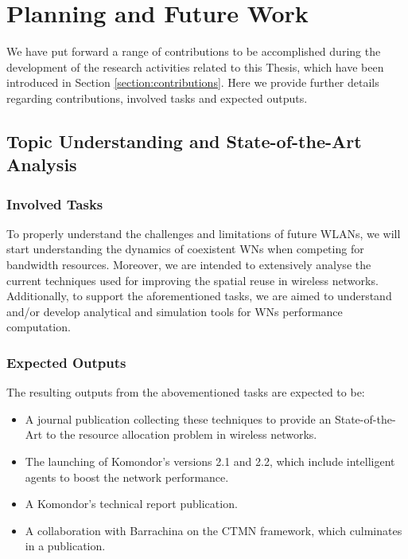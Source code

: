 \documentclass[12pt, a4paper,twoside]{tesi_upf}
\begin{document}
	\chapter{Planning and Future Work}
	\label{section:future_work}		
		We have put forward a range of contributions to be accomplished during the development of the research activities related to this Thesis, which have been introduced in Section \ref{section:contributions}. Here we provide further details regarding contributions, involved tasks and expected outputs.

		\section{Topic Understanding and State-of-the-Art Analysis}
		\label{section:contribution1}				
			\subsection{Involved Tasks}				
				To properly understand the challenges and limitations of future WLANs, we will start understanding the dynamics of coexistent WNs when competing for bandwidth resources. Moreover, we are intended to extensively analyse the current techniques used for improving the spatial reuse in wireless networks. Additionally, to support the aforementioned tasks, we are aimed to understand and/or develop analytical and simulation tools for WNs performance computation.		
			\subsection{Expected Outputs}
				The resulting outputs from the abovementioned tasks are expected to be:
				\begin{itemize}
					\item A journal publication collecting these techniques to provide an State-of-the-Art to the resource allocation problem in wireless networks.
					\item The launching of Komondor's versions 2.1 and 2.2, which include intelligent agents to boost the network performance. 
					\item A Komondor's technical report publication.	
					\item A collaboration with Barrachina on the CTMN framework, which culminates in a publication.				
				\end{itemize}
		
\end{document}

